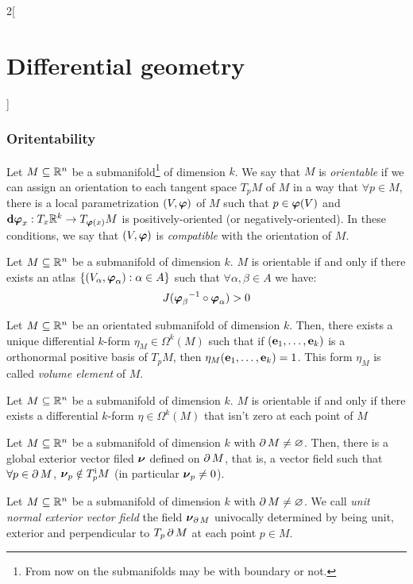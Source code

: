 \documentclass[../../../main.tex]{subfiles}
\begin{document}
\begin{multicols}{2}[\section{Differential geometry}]
  \subsubsection{Oritentability}
  \begin{definition}
    Let $M\subseteq\mathbb{R}^n$ be a submanifold\footnote{From now on the submanifolds may be with boundary or not.} of dimension $k$. We say that $M$ is \emph{orientable} if we can assign an orientation to each tangent space $T_pM$ of $M$ in a way that $\forall p\in M$, there is a local parametrization $(V,\boldsymbol{\mathrm{\varphi}})$ of $M$ such that $p\in\boldsymbol{\mathrm{\varphi}}(V)$ and $\boldsymbol{\mathrm{d\varphi}}_x:T_x\mathbb{R}^k\rightarrow T_{\boldsymbol{\mathrm{\varphi}}(x)}M$ is positively-oriented (or negatively-oriented). In these conditions, we say that $(V,\boldsymbol{\mathrm{\varphi}})$ is \emph{compatible} with the orientation of $M$.
  \end{definition}
  \begin{proposition}
    Let $M\subseteq\mathbb{R}^n$ be a submanifold of dimension $k$. $M$ is orientable if and only if there exists an atlas $\{(V_\alpha,\boldsymbol{\mathrm{\varphi}}_\alpha):\alpha\in A\}$ such that $\forall \alpha,\beta\in A$ we have: $$J({\boldsymbol{\mathrm{\varphi}}_\beta}^{-1}\circ\boldsymbol{\mathrm{\varphi}}_\alpha)>0$$
  \end{proposition}
  \begin{proposition}
    Let $M\subseteq\mathbb{R}^n$ be an orientated submanifold of dimension $k$. Then, there exists a unique differential $k$-form $\eta_M\in\Omega^k(M)$ such that if $(\boldsymbol{\mathrm{e}}_1,\ldots,\boldsymbol{\mathrm{e}}_k)$ is a orthonormal positive basis of $T_pM$, then $\eta_M(\boldsymbol{\mathrm{e}}_1,\ldots,\boldsymbol{\mathrm{e}}_k)=1$. This form $\eta_M$ is called \emph{volume element} of $M$.
  \end{proposition}
  \begin{proposition}
    Let $M\subseteq\mathbb{R}^n$ be a submanifold of dimension $k$. $M$ is orientable if and only if there exists a differential $k$-form $\eta\in\Omega^k(M)$ that isn't zero at each point of $M$
  \end{proposition}
  \begin{lemma}
    Let $M\subseteq\mathbb{R}^n$ be a submanifold of dimension $k$ with $\operatorname{\partial}{M}\ne\varnothing$. Then, there is a global exterior vector filed $\boldsymbol{\mathrm{\nu}}$ defined on $\operatorname{\partial}{M}$, that is, a vector field such that $\forall p\in\operatorname{\partial}{M}$, $\boldsymbol{\mathrm{\nu}}_p\notin T_p^\text{i}M$ (in particular $\boldsymbol{\mathrm{\nu}}_p\ne 0$).
  \end{lemma}
  \begin{definition}
    Let $M\subseteq\mathbb{R}^n$ be a submanifold of dimension $k$ with $\operatorname{\partial}{M}\ne\varnothing$. We call \emph{unit normal exterior vector field} the field $\boldsymbol{\mathrm{\nu}}_{\operatorname{\partial}{M}}$ univocally determined by being unit, exterior and perpendicular to $T_p\operatorname{\partial}{M}$ at each point $p\in M$.

\end{definition}
\end{multicols}
\end{document}
